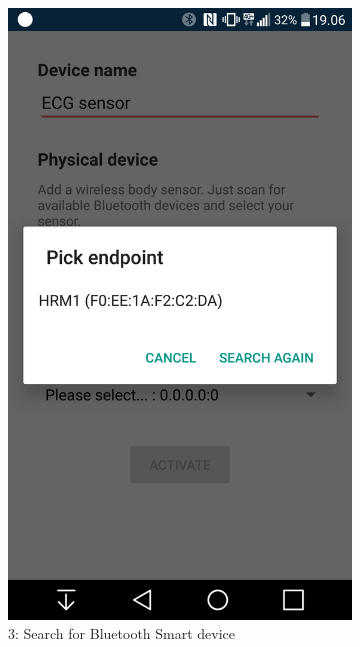 \begin{figure}[H]
\centering
    \begin{subfigure}[b]{0.49\textwidth}
        \includegraphics[width=\textwidth]{img/gw3.png}
        \caption*{3: Search for Bluetooth Smart device}
        \label{fig:01login}
    \end{subfigure}
    \begin{subfigure}[b]{0.49\textwidth}

\end{subfigure}
\end{figure}
